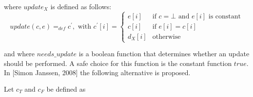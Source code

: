 \documentclass{article}
\begin{document}
where $update_{X}$ is defined as follows:%
\begin{equation*}
update(c,e)=_{def}c^{\prime },\text{ with }c^{\prime }[i]=\left\{ 
\begin{array}{ll}
e[i] & \text{if }c=\bot \text{ and }e[i]\text{ is constant} \\ 
c[i] & \text{if }e[i]=c[i] \\ 
d_{X}[i] & \text{otherwise}%
\end{array}%
\right.
\end{equation*}

and where $needs\_update$ is a boolean function that determines whether an
update should be performed. A safe choice for this function is the constant
function $true$. In [Simon Janssen, 2008] the following alternative is
proposed.

Let $c_{T}$ and $c_{F}$ be defined as
\end{document}
